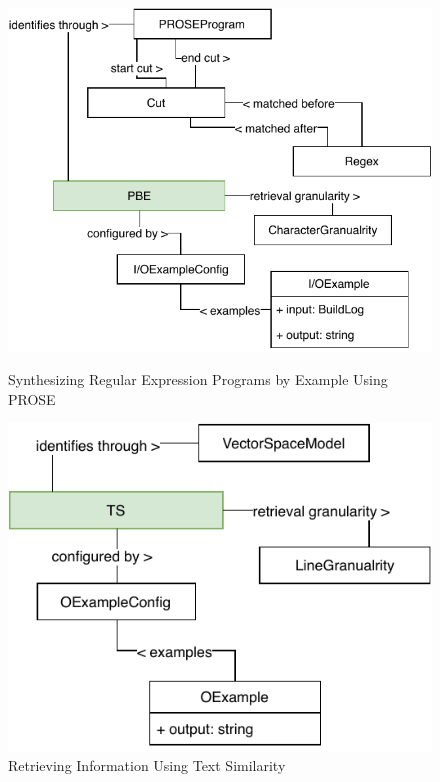 \documentclass[\myrootdir/main.tex]{subfiles}
\begin{document}
\begin{figure}[htbp]
	\centering
	\begin{minipage}{0.45\textwidth}
		\centering
		\includegraphics[width=\textwidth, clip]{img/pbe-technique.pdf}
		\caption{Synthesizing Regular Expression Programs by Example Using PROSE}
		\label{fig:prose-explanation}
	\end{minipage}\hfill
	\begin{minipage}{0.45\textwidth}
		\centering
		\includegraphics[width=\textwidth, clip]{img/ts-technique.pdf}
		\caption{Retrieving Information Using Text Similarity}
		\label{fig:text-similarity-explanation}
	\end{minipage}
\end{figure}
\end{document}
